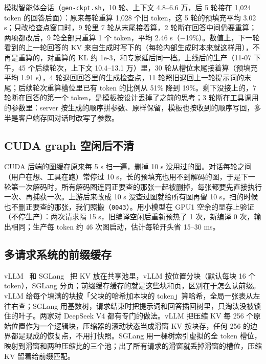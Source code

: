 \documentclass[11pt,a4paper]{article}
\newcommand{\code}[1]{\texttt{#1}}
\begin{document}
模拟智能体会话（\code{gen-ckpt.sh}，10 轮、上下文 4.8--6.6 万，后 5 轮接在 1,024 token 的回答后面）：原来每轮重算 1,028 个旧 token，这 5 轮的预填充平均 3.02 s；只改检查点窗口时，9 轮里 7 轮从末尾接着算，2 轮断在回答中间仍要重算；两项都改后，9 轮全部只重算 1 个 token，平均 2.46 s（$-$19\%）。数值上，下一轮看到的上一轮回答的 KV 来自生成时写下的（每轮内部生成时本来就这样用），不再是重算的，对重算的 KL 约 1e-3，和专家延后同一档。上线后的生产（11-07 下午，45 个后续轮次，上下文 10.4--13.1 万）里，30 轮从槽位末尾接着算（预填充平均 1.91 s），4 轮退回回答里的生成检查点，11 轮照旧退回上一轮提示词的末尾；后续轮次重算槽位里已有 token 的比例从 51\% 降到 19\%。剩下没接上的，7 轮断在回答的第一个 token，是模板按设计丢掉了之前的思考；3 轮断在工具调用的参数里：server 按生成的顺序拼参数、原样保留，模板也按收到的顺序写回，多半是客户端存回对话时改写了参数。

\subsection{CUDA graph 空闲后不清}
\label{sec:graphidle}

CUDA 后端的图缓存原来每 5 s 扫一遍，删掉 10 s 没用过的图。对话每轮之间（用户在想、工具在跑）常停过 10 s，长的预填充也用不到解码的图，于是下一轮第一次解码时，所有解码图连同正要查的那张一起被删掉，每张都要先直接执行一次、再捕获一次。上游后来改成 10 s 没查过图就给所有图再留 10 s，扫的时候也不删正要查的那张，我们照搬（\code{0043}）。用小模型在 GPU1 空余的显存上验证（不停生产）：两次请求隔 15 s，旧编译空闲后重新预热了 1 次，新编译 0 次，输出相同；生产每 token 约 46 次图启动，估计每轮开头省 15--30 ms。

\subsection{多请求系统的前缀缓存}
\label{sec:prefixcache}

vLLM~\cite{vllm} 和 SGLang~\cite{sglang} 把 KV 放在共享池里，vLLM 按位置分块（默认每块 16 个 token），SGLang 分页；前缀缓存缓存的就是这些块和页，区别在于怎么认前缀。vLLM 给每个填满的块按「父块的哈希加本块的 token」算哈希，全局一张表从左往右查；SGLang 用基数树，请求结束时把提示词和回答插回树里，只淘汰没被锁住的叶子。两家对 DeepSeek V4 都有专门的做法。vLLM 把压缩 KV 每 256 个原始位置作为一个逻辑块，压缩器的滚动状态当成滑窗 KV 按块存，任何 256 的边界都是现成的恢复点，不用打快照。SGLang 用一棵树索引虚拟的全 token 槽位，映射到滑窗和两种压缩比的三个池；出了所有请求的滑窗就丢掉滑窗的槽位，压缩 KV 留着给前缀匹配。
\end{document}
